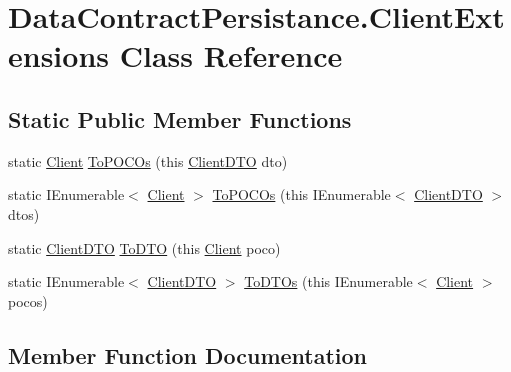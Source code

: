 \hypertarget{classDataContractPersistance_1_1ClientExtensions}{}\section{Data\+Contract\+Persistance.\+Client\+Extensions Class Reference}
\label{classDataContractPersistance_1_1ClientExtensions}
\subsection*{Static Public Member Functions}
\begin{DoxyCompactItemize}
\item 
static \hyperlink{classModele_1_1Client}{Client} \hyperlink{classDataContractPersistance_1_1ClientExtensions_a3492e2affc56bac7ca3febd377ce9e37}{To\+P\+O\+C\+Os} (this \hyperlink{classDataContractPersistance_1_1ClientDTO}{Client\+D\+TO} dto)
\item 
static I\+Enumerable$<$ \hyperlink{classModele_1_1Client}{Client} $>$ \hyperlink{classDataContractPersistance_1_1ClientExtensions_aad7988e164f80a2cb19a3d1262f7dbdf}{To\+P\+O\+C\+Os} (this I\+Enumerable$<$ \hyperlink{classDataContractPersistance_1_1ClientDTO}{Client\+D\+TO} $>$ dtos)
\item 
static \hyperlink{classDataContractPersistance_1_1ClientDTO}{Client\+D\+TO} \hyperlink{classDataContractPersistance_1_1ClientExtensions_afd705fae62a0e5c366b7c21f67c9573d}{To\+D\+TO} (this \hyperlink{classModele_1_1Client}{Client} poco)
\item 
static I\+Enumerable$<$ \hyperlink{classDataContractPersistance_1_1ClientDTO}{Client\+D\+TO} $>$ \hyperlink{classDataContractPersistance_1_1ClientExtensions_af12938f02708adcb6bb89f0345f121b5}{To\+D\+T\+Os} (this I\+Enumerable$<$ \hyperlink{classModele_1_1Client}{Client} $>$ pocos)
\end{DoxyCompactItemize}


\subsection{Member Function Documentation}
\mbox{\label{classDataContractPersistance_1_1ClientExtensions_afd705fae62a0e5c366b7c21f67c9573d}} 
